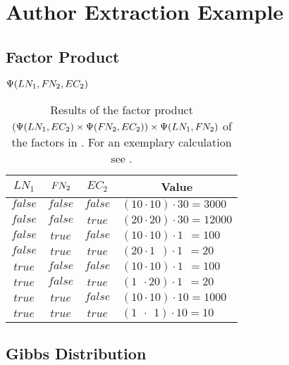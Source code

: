 \chapter{Author Extraction Example}\label{app:cha-author-extraction-example}
\section{Factor Product}\label{app:sec-factor-product}
\begin{table}[H]
\centering
$\Psi(LN_1,F\hspace{-0.07em} N_2,EC_2)$\par
\smallskip
\begin{tabular}{c c c l}
 \toprule
 $LN_1$ & $F\hspace{-0.07em} N_2$ & $EC_2$ & \multicolumn{1}{c}{Value} \\
 \midrule
 $\mathit{false}$ & $\mathit{false}$ & $\mathit{false}$ & $(10\cdot10)\cdot30=3000$\\
 $\mathit{false}$ & $\mathit{false}$ & $\mathit{true}$  & $(20\cdot20)\cdot30=12000$\\
 $\mathit{false}$ & $\mathit{true}$  & $\mathit{false}$ & $(10\cdot10)\cdot1\ \ =100$\\
 $\mathit{false}$ & $\mathit{true}$  & $\mathit{true}$  & $(20\cdot1\ \ )\cdot1\ \ =20$\\
 $\mathit{true}$  & $\mathit{false}$ & $\mathit{false}$ & $(10\cdot10)\cdot1\ \ =100$\\
 $\mathit{true}$  & $\mathit{false}$ & $\mathit{true}$  & $(1\ \ \cdot20)\cdot1\ \ =20$\\
 $\mathit{true}$  & $\mathit{true}$  & $\mathit{false}$ & $(10\cdot10)\cdot10=1000$\\
 $\mathit{true}$  & $\mathit{true}$  & $\mathit{true}$  & $(1\ \ \cdot\ \ 1)\cdot10=10$\\
 \bottomrule
\end{tabular}
\caption{Results of the \gls{factor product} $(\Psi(LN_1,EC_2)\times\Psi(F\hspace{-0.07em} N_2,EC_2))\times\Psi(LN_1,F\hspace{-0.07em} N_2)$ of the \glspl{factor} in . For an exemplary calculation see .}
\label{tab:example-factor-product}
\end{table}
\section{Gibbs Distribution}\label{app:sec-gibbs-distribution}
